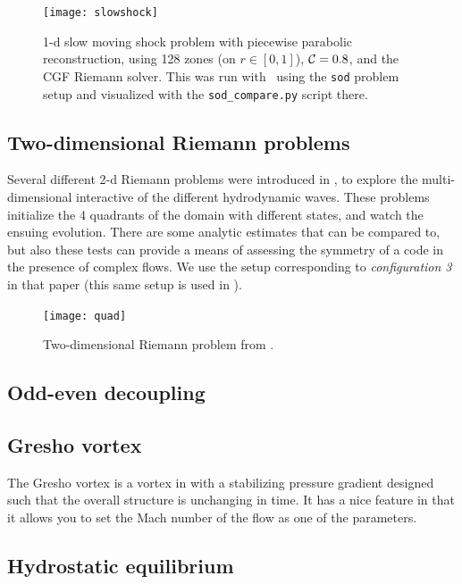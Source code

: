 \begin{figure}[t]
\centering
\texttt{[image: slowshock]}
\caption[1-d spherical Sedov problem]{\label{fig:Euler:slowshock:ppm} 1-d slow moving shock
  problem with
  piecewise parabolic reconstruction, using 128 zones (on $r \in
  [0,1]$), ${\mathcal{C}} = 0.8$, and the CGF Riemann solver.  This was run
  with \hydrooned\ using the {\tt sod} problem setup and visualized
  with the {\tt sod\_compare.py} script there.}
\end{figure}


\subsection{Two-dimensional Riemann problems}

Several different 2-d Riemann problems were introduced in
\cite{hydro_test_quad}, to explore the multi-dimensional
interactive of the different hydrodynamic waves.  These
problems initialize the 4 quadrants of the domain with different
states, and watch the ensuing evolution.  There are some
analytic estimates that can be compared to, but also these
tests can provide a means of assessing the symmetry of 
a code in the presence of complex flows.  We use the setup
corresponding to {\em configuration 3} in that paper (this
same setup is used in \cite{leveque:1997}).

\begin{figure}[t]
\centering
\texttt{[image: quad]}
\caption{\label{fig:Euler:quad} Two-dimensional Riemann problem
from \cite{hydro_test_quad}.}
\end{figure}

\ifdefined \debugmode
\subsection{Odd-even decoupling}

\subsection{Gresho vortex}

The Gresho vortex is a vortex in with a stabilizing pressure gradient
designed such that the overall structure is unchanging in time.  It
has a nice feature in that it allows you to set the Mach number of
the flow as one of the parameters.


\subsection{Hydrostatic equilibrium}

